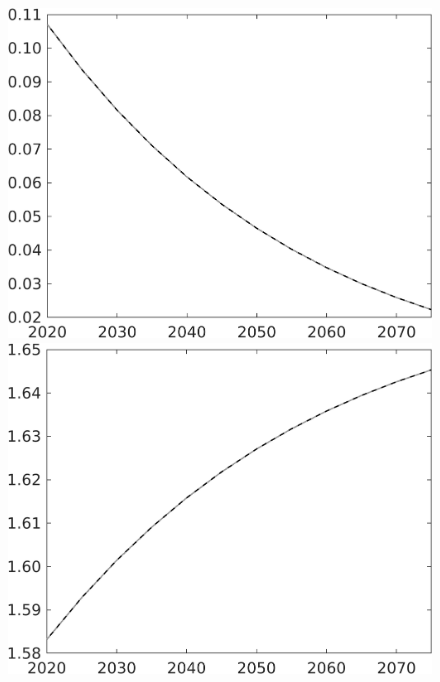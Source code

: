 \documentclass[12pt]{article}
\begin{document}
\begin{figure}[h!!]
\begin{minipage}[]{0.32\textwidth}
	\end{minipage}	
	\begin{minipage}[]{0.32\textwidth}
		\includegraphics[width=1\textwidth]{../../codding_model/own_basedOnFried/optimalPol_010922_revision/figures/all_13Sept22/CompTaul_LFBAU_Reg0_pee_spillover0_nsk0_xgr1_knspil1_sep1_countec0_GovRev0_etaa0.79_lgd0.png}
	\end{minipage}	
	\begin{minipage}[]{0.32\textwidth}
		\includegraphics[width=1\textwidth]{../../codding_model/own_basedOnFried/optimalPol_010922_revision/figures/all_13Sept22/CompTaul_LFBAU_Reg0_pn_spillover0_nsk0_xgr1_knspil1_sep1_countec0_GovRev0_etaa0.79_lgd0.png}

\end{minipage}
\end{figure}
\end{document}
